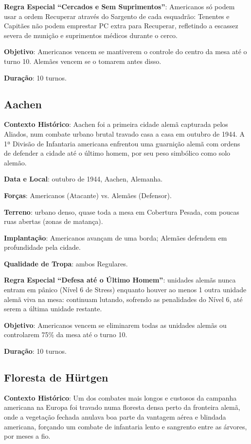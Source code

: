 \documentclass[11pt]{article}
\begin{document}
\textbf{Regra Especial ``Cercados e Sem Suprimentos''}: Americanos só podem usar a ordem Recuperar através do Sargento de cada esquadrão: Tenentes e Capitães não podem emprestar PC extra para Recuperar, refletindo a escassez severa de munição e suprimentos médicos durante o cerco.

\textbf{Objetivo}: Americanos vencem se mantiverem o controle do centro da mesa até o turno 10. Alemães vencem se o tomarem antes disso.

\textbf{Duração}: 10 turnos.

\subsection{Aachen}

\textbf{Contexto Histórico}: Aachen foi a primeira cidade alemã capturada pelos Aliados, num combate urbano brutal travado casa a casa em outubro de 1944. A 1ª Divisão de Infantaria americana enfrentou uma guarnição alemã com ordens de defender a cidade até o último homem, por seu peso simbólico como solo alemão.

\textbf{Data e Local}: outubro de 1944, Aachen, Alemanha.

\textbf{Forças}: Americanos (Atacante) vs. Alemães (Defensor).

\textbf{Terreno}: urbano denso, quase toda a mesa em Cobertura Pesada, com poucas ruas abertas (zonas de matança).

\textbf{Implantação}: Americanos avançam de uma borda; Alemães defendem em profundidade pela cidade.

\textbf{Qualidade de Tropa}: ambos Regulares.

\textbf{Regra Especial ``Defesa até o Último Homem''}: unidades alemãs nunca entram em pânico (Nível 6 de Stress) enquanto houver ao menos 1 outra unidade alemã viva na mesa: continuam lutando, sofrendo as penalidades do Nível 6, até serem a última unidade restante.

\textbf{Objetivo}: Americanos vencem se eliminarem todas as unidades alemãs ou controlarem 75\% da mesa até o turno 10.

\textbf{Duração}: 10 turnos.

\subsection{Floresta de Hürtgen}

\textbf{Contexto Histórico}: Um dos combates mais longos e custosos da campanha americana na Europa foi travado numa floresta densa perto da fronteira alemã, onde a vegetação fechada anulava boa parte da vantagem aérea e blindada americana, forçando um combate de infantaria lento e sangrento entre as árvores, por meses a fio.
\end{document}
